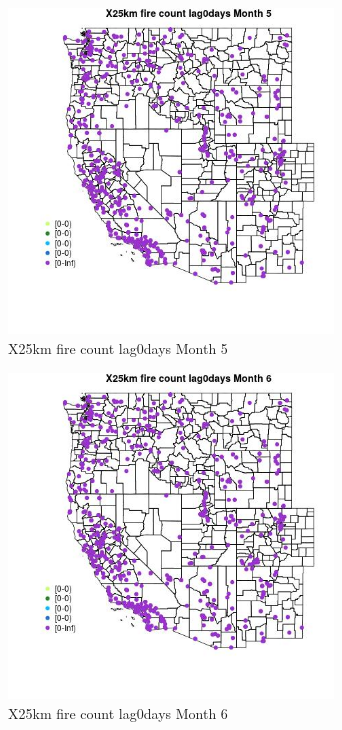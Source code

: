\begin{figure} 
\centering  
\includegraphics[width=0.77\textwidth]{Code_Outputs/Report_ML_input_PM25_Step4_part_e_de_duplicated_aves_compiled_2019-05-14wNAs_MapObsMo5X25km_fire_count_lag0days.jpg} 
\caption{\label{fig:Report_ML_input_PM25_Step4_part_e_de_duplicated_aves_compiled_2019-05-14wNAsMapObsMo5X25km_fire_count_lag0days}X25km fire count lag0days Month 5} 
\end{figure} 
 

\clearpage 

\begin{figure} 
\centering  
\includegraphics[width=0.77\textwidth]{Code_Outputs/Report_ML_input_PM25_Step4_part_e_de_duplicated_aves_compiled_2019-05-14wNAs_MapObsMo6X25km_fire_count_lag0days.jpg} 
\caption{\label{fig:Report_ML_input_PM25_Step4_part_e_de_duplicated_aves_compiled_2019-05-14wNAsMapObsMo6X25km_fire_count_lag0days}X25km fire count lag0days Month 6} 
\end{figure} 
 

